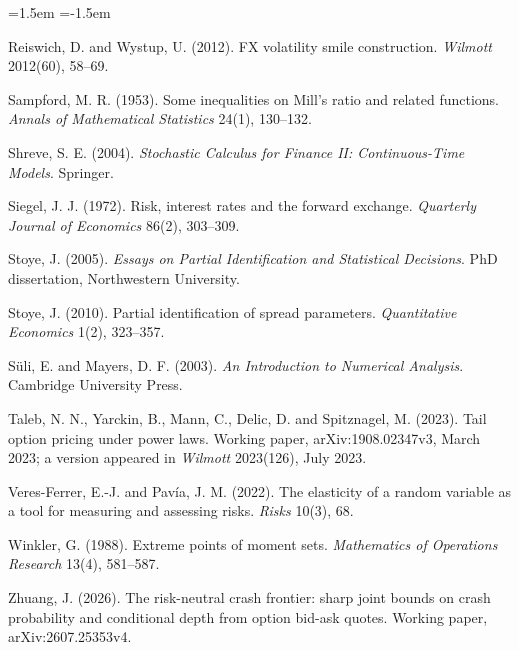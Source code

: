 \documentclass[11pt]{article}
\theoremstyle{remark}
\begin{document}
\begin{list}{}{\leftmargin=1.5em \itemindent=-1.5em \itemsep=2pt \parsep=0pt}
\item Reiswich, D. and Wystup, U. (2012). FX volatility smile construction. \emph{Wilmott} 2012(60), 58--69.
\item Sampford, M. R. (1953). Some inequalities on Mill's ratio and related functions. \emph{Annals of Mathematical Statistics} 24(1), 130--132.
\item Shreve, S. E. (2004). \emph{Stochastic Calculus for Finance II: Continuous-Time Models}. Springer.
\item Siegel, J. J. (1972). Risk, interest rates and the forward exchange. \emph{Quarterly Journal of Economics} 86(2), 303--309.
\item Stoye, J. (2005). \emph{Essays on Partial Identification and Statistical Decisions}. PhD dissertation, Northwestern University.
\item Stoye, J. (2010). Partial identification of spread parameters. \emph{Quantitative Economics} 1(2), 323--357.
\item S\"uli, E. and Mayers, D. F. (2003). \emph{An Introduction to Numerical Analysis}. Cambridge University Press.
\item Taleb, N. N., Yarckin, B., Mann, C., Delic, D. and Spitznagel, M. (2023). Tail option pricing under power laws. Working paper, arXiv:1908.02347v3, March 2023; a version appeared in \emph{Wilmott} 2023(126), July 2023.
\item Veres-Ferrer, E.-J. and Pav\'ia, J. M. (2022). The elasticity of a random variable as a tool for measuring and assessing risks. \emph{Risks} 10(3), 68.
\item Winkler, G. (1988). Extreme points of moment sets. \emph{Mathematics of Operations Research} 13(4), 581--587.
\item Zhuang, J. (2026). The risk-neutral crash frontier: sharp joint bounds on crash probability and conditional depth from option bid-ask quotes. Working paper, arXiv:2607.25353v4.
\end{list}
\end{document}
